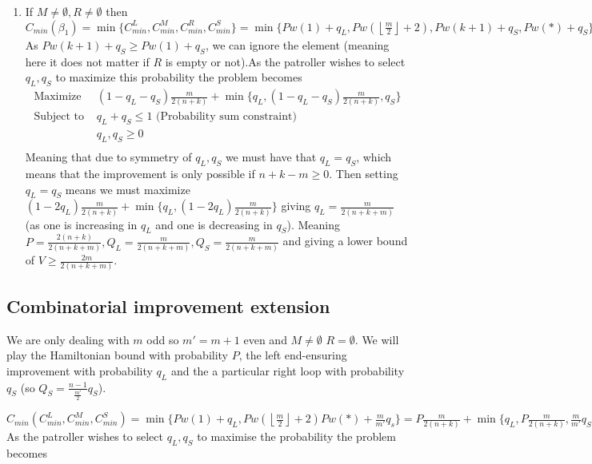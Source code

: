 \documentclass[a4paper,10pt]{article}
\newcommand{\floor}[1]{\left \lfloor #1 \right \rfloor}
\theoremstyle{definition}
\theoremstyle{definition}
\theoremstyle{remark}
\theoremstyle{definition}
\begin{document}
\begin{enumerate}
\item If $M \neq \emptyset , R \neq \emptyset$ then $C_{min} (\beta_{1})=\min \{ C_{min}^{L} , C_{min}^{M} , C_{min}^{R}, C_{min}^{S} \}=\min \{ Pw(1)+q_{L}, Pw(\floor{\frac{m}{2}}+2), Pw(k+1)+q_{S}, Pw(*)+q_{S} \}=\min \{ Pw(1)+q_{L}, Pw(\floor{\frac{m}{2}}+2), Pw(*)+q_{S} \}=P \frac{m}{2(n+k)} + \min \{ q_{L}, P \frac{m}{2(n+k)} , q_{S}  \}$ As $Pw(k+1)+q_{S} \geq Pw(1)+q_{S}$, we can ignore the element (meaning here it does not matter if $R$ is empty or not).As the patroller wishes to select $q_{L},q_{S}$ to maximize this probability the problem becomes
$$\begin{array}{cc}
\text{Maximize} & (1-q_{L}-q_{S}) \frac{m}{2(n+k)} + \min \{ q_{L}, (1-q_{L}-q_{S}) \frac{m}{2(n+k)} , q_{S} \}\\
\text{Subject to } & q_{L}+q_{S} \leq 1 \text{  (Probability sum constraint)} \\
     & q_{L},q_{S} \geq 0 \\
\end{array} $$
Meaning that due to symmetry of $q_{L},q_{S}$ we must have that $q_{L}=q_{S}$, which means that the improvement is only possible if $n+k-m \geq 0$. Then setting $q_{L}=q_{S}$ means we must maximize $(1-2q_{L})\frac{m}{2(n+k)} + \min \{ q_{L} , (1-2q_{L}) \frac{m}{2(n+k)} \}$ giving $q_{L}=\frac{m}{2(n+k+m)}$ (as one is increasing in $q_{L}$ and one is decreasing in $q_{S}$). Meaning $P=\frac{2(n+k)}{2(n+k+m)},Q_{L}=\frac{m}{2(n+k+m)},Q_{S}=\frac{m}{2(n+k+m)}$ and giving a lower bound of $V \geq \frac{2m}{2(n+k+m)}$.
\end{enumerate}

\subsection{Combinatorial improvement extension}
\label{Appendix:Combinatorial improvement extension}
We are only dealing with $m$ odd so $m'=m+1$ even and $M \neq \emptyset$ $R = \emptyset$. We will play the Hamiltonian bound with probability $P$, the left end-ensuring improvement with probability $q_{L}$ and the a particular right loop with probability $q_{S}$ (so $Q_{S}=\frac{n-1}{\frac{m'}{2}}q_{S}$).

$C_{min}(C_{min}^{L},C_{min}^M,C_{min}^S)=\min\{Pw(1)+q_{L},Pw(\floor{\frac{m}{2}}+2) Pw(*)+\frac{m}{m'}q_{s}\}=P\frac{m}{2(n+k)}+\min\{q_{L},P\frac{m}{2(n+k)},\frac{m}{m'}q_{S} \}$ As the patroller wishes to select $q_{L},q_{S}$ to maximise the probability the problem becomes
\end{document}
